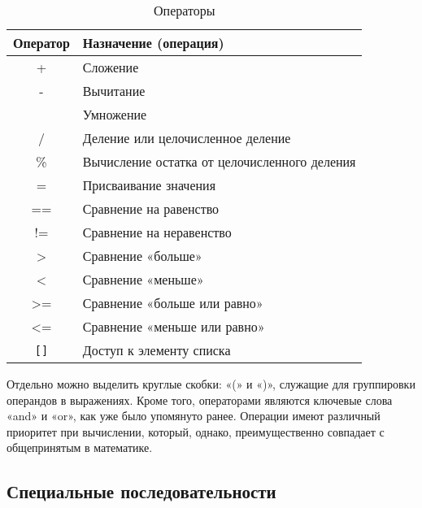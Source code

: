 \begin{table}[h]
    \centering
    \caption{Операторы}
    \label{tab:operators}
    \begin{tabular}{>{\ttfamily}c p{12cm}}
        \toprule
        \textrm{\normalfont Оператор} & \textrm{\normalfont Назначение (операция)}   \\
        \midrule
        +                             & Сложение                                     \\
        -                             & Вычитание                                    \\
        *                             & Умножение                                    \\
        /                             & Деление или целочисленное деление            \\
        \%                            & Вычисление остатка от целочисленного деления \\
        =                             & Присваивание значения                        \\
        ==                            & Сравнение на равенство                       \\
        !=                            & Сравнение на неравенство                     \\
        >                             & Сравнение «больше»                           \\
        <                             & Сравнение «меньше»                           \\
        >=                            & Сравнение «больше или равно»                 \\
        <=                            & Сравнение «меньше или равно»                 \\
        \verb|[]|                     & Доступ к элементу списка                     \\
        \bottomrule
    \end{tabular}
\end{table}

Отдельно можно выделить круглые скобки: «(» и «)», служащие для группировки операндов в выражениях.
Кроме того, операторами являются ключевые слова «and» и «or», как уже было упомянуто ранее.
Операции имеют различный приоритет при вычислении, который, однако, преимущественно совпадает с общепринятым в математике.

\subsection{Специальные последовательности}
\label{sec:special_sequences}

